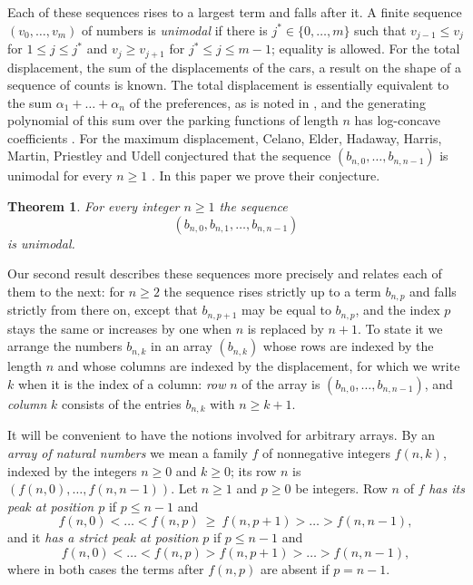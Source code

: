 \documentclass{amsart}
\newtheorem{theorem}{Theorem}[section]
\theoremstyle{definition}
\theoremstyle{remark}
\numberwithin{equation}{section}
\begin{document}
Each of these sequences rises to a largest term and falls after it. A finite
sequence $(v_0,\dots,v_m)$ of numbers is \emph{unimodal} if there is
$j^*\in\{0,\dots,m\}$ such that $v_{j-1}\le v_j$ for $1\le j\le j^*$ and
$v_j\ge v_{j+1}$ for $j^*\le j\le m-1$; equality is allowed. For the total
displacement, the sum of the displacements of the cars, a result on the
shape of a sequence of counts is known. The total displacement is
essentially equivalent to the sum $\alpha_1+\dots+\alpha_n$ of the
preferences, as is noted in \cite{pappe2024}, and the generating polynomial
of this sum over the parking functions of length $n$ has log-concave
coefficients \cite[Theorem~3.1]{pappe2024}. For the maximum displacement,
Celano, Elder, Hadaway, Harris, Martin, Priestley and Udell conjectured that
the sequence $(b_{n,0},\dots,b_{n,n-1})$ is unimodal for every $n\ge1$
\cite[Conjecture~6.5]{celano2025}. In this paper we prove their conjecture.

\begin{theorem}\label{thm:main}
For every integer $n\ge1$ the sequence
\[
(b_{n,0},b_{n,1},\dots,b_{n,n-1})
\]
is unimodal.
\end{theorem}

Our second result describes these sequences more precisely and relates each
of them to the next: for $n\ge2$ the sequence rises strictly up to a term
$b_{n,p}$ and falls strictly from there on, except that $b_{n,p+1}$ may be
equal to $b_{n,p}$, and the index $p$ stays the same or increases by one
when $n$ is replaced by $n+1$. To state it we arrange the numbers $b_{n,k}$
in an array $(b_{n,k})$ whose rows are indexed by the length $n$ and whose
columns are indexed by the displacement, for which we write $k$ when it is
the index of a column:
\emph{row} $n$ of the array is $(b_{n,0},\dots,b_{n,n-1})$, and
\emph{column} $k$ consists of the entries $b_{n,k}$ with $n\ge k+1$.

It will be convenient to have the notions involved for arbitrary arrays. By
an \emph{array of natural numbers} we mean a family $f$ of nonnegative integers $f(n,k)$,
indexed by the integers $n\ge0$ and $k\ge0$; its row $n$ is
$(f(n,0),\dots,f(n,n-1))$. Let $n\ge1$ and $p\ge0$ be integers. Row $n$ of
$f$ \emph{has its peak at position $p$} if $p\le n-1$ and
\[
f(n,0)<\dots<f(n,p)\ \ge\ f(n,p+1)>\dots>f(n,n-1),
\]
and it \emph{has a strict peak at position $p$} if $p\le n-1$ and
\[
f(n,0)<\dots<f(n,p)>f(n,p+1)>\dots>f(n,n-1),
\]
where in both cases the terms after $f(n,p)$ are absent if $p=n-1$.
\end{document}
